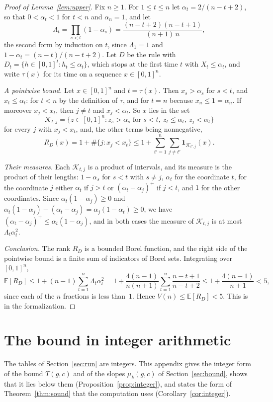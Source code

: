 \documentclass[11pt]{amsart}
\theoremstyle{definition}
\numberwithin{equation}{section}
\newcommand{\E}{\mathbb{E}}
\newcommand{\one}{\mathbf{1}}
\begin{document}
\begin{proof}[Proof of Lemma~\ref{lem:upper}]
Fix $n\ge1$. For $1\le t\le n$ let $\alpha_t=2/(n-t+2)$, so that $0<\alpha_t<1$ for $t<n$ and $\alpha_n=1$, and let
\[
\Lambda_t=\prod_{s<t}(1-\alpha_s)=\frac{(n-t+2)(n-t+1)}{(n+1)\,n},
\]
the second form by induction on $t$, since $\Lambda_1=1$ and $1-\alpha_t=(n-t)/(n-t+2)$. Let $D$ be the rule with $D_t=\{h\in[0,1]^t:h_t\le\alpha_t\}$, which stops at the first time $t$ with $X_t\le\alpha_t$, and write $\tau(x)$ for its time on a sequence $x\in[0,1]^n$.

\emph{A pointwise bound.} Let $x\in[0,1]^n$ and $t=\tau(x)$. Then $x_s>\alpha_s$ for $s<t$, and $x_t\le\alpha_t$: for $t<n$ by the definition of $\tau$, and for $t=n$ because $x_n\le1=\alpha_n$. If moreover $x_j<x_t$, then $j\ne t$ and $x_j<\alpha_t$. So $x$ lies in the set
\[
\mathcal K_{t,j}=\{z\in[0,1]^n: z_s>\alpha_s\text{ for }s<t,\ z_t\le\alpha_t,\ z_j<\alpha_t\}
\]
for every $j$ with $x_j<x_t$, and, the other terms being nonnegative,
\[
R_D(x)=1+\#\{j:x_j<x_t\}\le1+\sum_{t'=1}^n\sum_{j\ne t'}\one_{\mathcal K_{t',j}}(x).
\]

\emph{Their measures.} Each $\mathcal K_{t,j}$ is a product of intervals, and its measure is the product of their lengths: $1-\alpha_s$ for $s<t$ with $s\ne j$, $\alpha_t$ for the coordinate $t$, for the coordinate $j$ either $\alpha_t$ if $j>t$ or $(\alpha_t-\alpha_j)^+$ if $j<t$, and $1$ for the other coordinates. Since $\alpha_t(1-\alpha_j)\ge0$ and $\alpha_t(1-\alpha_j)-(\alpha_t-\alpha_j)=\alpha_j(1-\alpha_t)\ge0$, we have $(\alpha_t-\alpha_j)^+\le\alpha_t(1-\alpha_j)$, and in both cases the measure of $\mathcal K_{t,j}$ is at most $\Lambda_t\alpha_t^2$.

\emph{Conclusion.} The rank $R_D$ is a bounded Borel function, and the right side of the pointwise bound is a finite sum of indicators of Borel sets. Integrating over $[0,1]^n$,
\[
\E[R_D]\le1+(n-1)\sum_{t=1}^n\Lambda_t\alpha_t^2=1+\frac{4(n-1)}{n(n+1)}\sum_{t=1}^n\frac{n-t+1}{n-t+2}\le1+\frac{4(n-1)}{n+1}<5,
\]
since each of the $n$ fractions is less than~$1$. Hence $V(n)\le\E[R_D]<5$. This is  in the formalization.
\end{proof}

\section{The bound in integer arithmetic}\label{app:integer}

The tables of Section~\ref{sec:run} are integers. This appendix gives the integer form of the bound $T(g,c)$ and of the slopes $\mu_k(g,c)$ of Section~\ref{sec:bound}, shows that it lies below them (Proposition~\ref{prop:integer}), and states the form of Theorem~\ref{thm:sound} that the computation uses (Corollary~\ref{cor:integer}).
\end{document}
